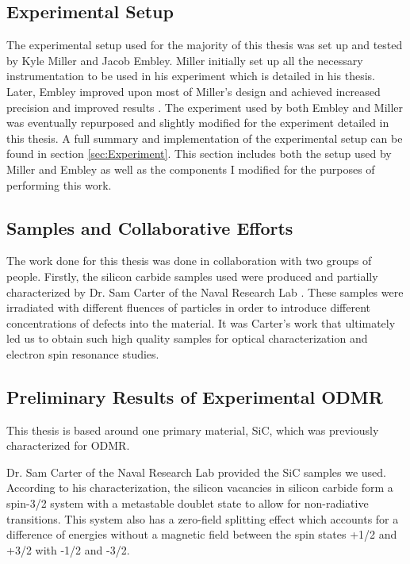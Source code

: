 \documentclass[oneside, noacknowlegments]{BYUPhys}
\begin{document}
\subsection{Experimental Setup}

The experimental setup used for the majority of this thesis was set up and tested by Kyle Miller and Jacob Embley. Miller initially set up all the necessary instrumentation to be used in his experiment which is detailed in his thesis. Later, Embley improved upon most of Miller's design and achieved increased precision and improved results \cite{RefWorks:doc:5892912ae4b0dec22aee3993}. The experiment used by both Embley and Miller was eventually repurposed and slightly modified for the experiment detailed in this thesis. A full summary and implementation of the experimental setup can be found in section \ref{sec:Experiment}. This section includes both the setup used by Miller and Embley as well as the components I modified for the purposes of performing this work.

\subsection{Samples and Collaborative Efforts}

The work done for this thesis was done in collaboration with two groups of people. Firstly, the silicon carbide samples used were produced and partially characterized by Dr. Sam Carter of the Naval Research Lab \cite{RefWorks:doc:5892964ee4b0499fa95c5108}. These samples were irradiated with different fluences of particles in order to introduce different concentrations of defects into the material. It was Carter's work that ultimately led us to obtain such high quality samples for optical characterization and electron spin resonance studies.

\subsection{Preliminary Results of Experimental ODMR}

This thesis is based around one primary material, SiC, which was previously characterized for ODMR.

Dr. Sam Carter of the Naval Research Lab provided the SiC samples we used. According to his characterization, the silicon vacancies in silicon carbide form a spin-3/2 system with a metastable doublet state to allow for non-radiative transitions. This system also has a zero-field splitting effect which accounts for a difference of energies without a magnetic field between the spin states +1/2 and +3/2 with -1/2 and -3/2.
 
\end{document}
